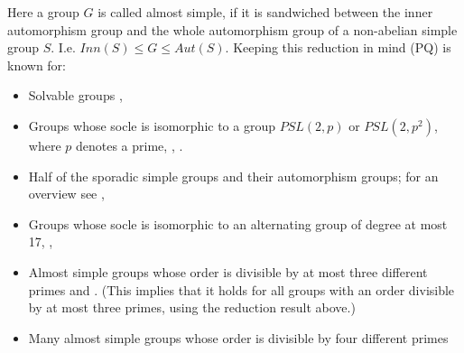 \documentclass[a4paper,11pt]{report}
\begin{document}
{{ Here a group $G$ is called almost simple, if it is sandwiched between the inner automorphism
group and the whole automorphism group of a non-abelian simple group $S$. I.e. $Inn(S) \leq G \leq Aut(S).$ Keeping this reduction in mind (PQ) is known for: 
\begin{itemize}
\item  Solvable groups \cite{KimmiPQ}, 
\item  Groups whose socle is isomorphic to a group $PSL(2,p)$ or $PSL(2,p^2)$, where $p$ denotes a prime, \cite{HertweckBrauer}, \cite{BaMa4prI}. 
\item  Half of the sporadic simple groups and their automorphism groups; for an
overview see \cite{KonovalovKimmiStAndrews}, 
\item  Groups whose socle is isomorphic to an alternating group of degree at most 17, \cite{SalimA7A8} \cite{SalimA9A10}\cite{BaCa}, 
\item  Almost simple groups whose order is divisible by at most three different
primes \cite{KonovalovKimmiStAndrews} and \cite{BaMaM10}. (This implies that it holds for all groups with an order divisible by at
most three primes, using the reduction result above.) 
\item  Many almost simple groups whose order is divisible by four different primes \cite{BaMa4prI} 
\end{itemize}
 }

 }

   
\end{document}

